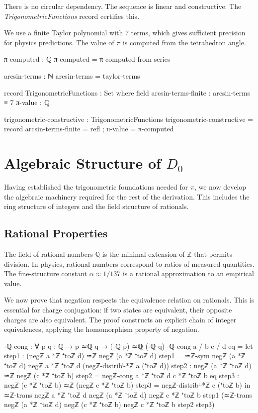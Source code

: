 \documentclass[11pt,a4paper]{book}
\begin{document}
There is no circular dependency. The sequence is linear and constructive.
The \emph{TrigonometricFunctions} record certifies this.

We use a finite Taylor polynomial with 7 terms, which gives sufficient precision
for physics predictions. The value of $\pi$ is computed from the tetrahedron angle.

\begin{code}
π-computed : ℚ
π-computed = π-computed-from-series

arcsin-terms : ℕ
arcsin-terms = taylor-terms

record TrigonometricFunctions : Set where
  field
    arcsin-terms-finite : arcsin-terms ≡ 7
    π-value : ℚ

trigonometric-constructive : TrigonometricFunctions
trigonometric-constructive = record
  { arcsin-terms-finite = refl
  ; π-value = π-computed
  }
\end{code}

\chapter{Algebraic Structure of $D_0$}
\label{chap:algebraic-structure}

Having established the trigonometric foundations needed for $\pi$, we now develop the algebraic machinery required for the rest of the derivation. This includes the ring structure of integers and the field structure of rationals.

\section{Rational Properties}

The field of rational numbers $\mathbb{Q}$ is the minimal extension of $\mathbb{Z}$ that permits division.
In physics, rational numbers correspond to ratios of measured quantities.
The fine-structure constant $\alpha \approx 1/137$ is a rational approximation to an empirical value.

We now prove that negation respects the equivalence relation on rationals.
This is essential for charge conjugation: if two states are equivalent, their opposite charges are also equivalent.
The proof constructs an explicit chain of integer equivalences, applying the homomorphism property of negation.

\begin{code}
-ℚ-cong : ∀ {p q : ℚ} → p ≃ℚ q → (-ℚ p) ≃ℚ (-ℚ q)
-ℚ-cong {a / b} {c / d} eq = 
  let step1 : (negℤ a *ℤ ⁺toℤ d) ≃ℤ negℤ (a *ℤ ⁺toℤ d)
      step1 = ≃ℤ-sym {negℤ (a *ℤ ⁺toℤ d)} {negℤ a *ℤ ⁺toℤ d} (negℤ-distribˡ-*ℤ a (⁺toℤ d))
      step2 : negℤ (a *ℤ ⁺toℤ d) ≃ℤ negℤ (c *ℤ ⁺toℤ b)
      step2 = negℤ-cong {a *ℤ ⁺toℤ d} {c *ℤ ⁺toℤ b} eq
      step3 : negℤ (c *ℤ ⁺toℤ b) ≃ℤ (negℤ c *ℤ ⁺toℤ b)
      step3 = negℤ-distribˡ-*ℤ c (⁺toℤ b)
  in ≃ℤ-trans {negℤ a *ℤ ⁺toℤ d} {negℤ (a *ℤ ⁺toℤ d)} {negℤ c *ℤ ⁺toℤ b}
       step1 (≃ℤ-trans {negℤ (a *ℤ ⁺toℤ d)} {negℤ (c *ℤ ⁺toℤ b)} {negℤ c *ℤ ⁺toℤ b} step2 step3)
\end{code}
\end{document}
